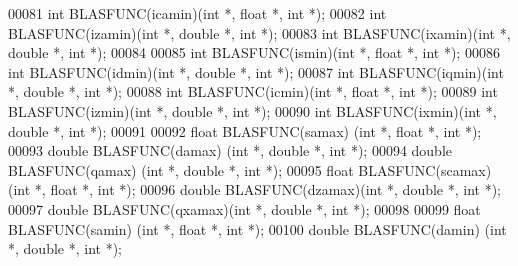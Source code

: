 \begin{DoxyCode}
00081 \textcolor{keywordtype}{int}    BLASFUNC(icamin)(\textcolor{keywordtype}{int} *, \textcolor{keywordtype}{float}  *, \textcolor{keywordtype}{int} *);
00082 \textcolor{keywordtype}{int}    BLASFUNC(izamin)(\textcolor{keywordtype}{int} *, \textcolor{keywordtype}{double} *, \textcolor{keywordtype}{int} *);
00083 \textcolor{keywordtype}{int}    BLASFUNC(ixamin)(\textcolor{keywordtype}{int} *, \textcolor{keywordtype}{double} *, \textcolor{keywordtype}{int} *);
00084 
00085 \textcolor{keywordtype}{int}    BLASFUNC(ismin)(\textcolor{keywordtype}{int} *, \textcolor{keywordtype}{float}  *, \textcolor{keywordtype}{int} *);
00086 \textcolor{keywordtype}{int}    BLASFUNC(idmin)(\textcolor{keywordtype}{int} *, \textcolor{keywordtype}{double} *, \textcolor{keywordtype}{int} *);
00087 \textcolor{keywordtype}{int}    BLASFUNC(iqmin)(\textcolor{keywordtype}{int} *, \textcolor{keywordtype}{double} *, \textcolor{keywordtype}{int} *);
00088 \textcolor{keywordtype}{int}    BLASFUNC(icmin)(\textcolor{keywordtype}{int} *, \textcolor{keywordtype}{float}  *, \textcolor{keywordtype}{int} *);
00089 \textcolor{keywordtype}{int}    BLASFUNC(izmin)(\textcolor{keywordtype}{int} *, \textcolor{keywordtype}{double} *, \textcolor{keywordtype}{int} *);
00090 \textcolor{keywordtype}{int}    BLASFUNC(ixmin)(\textcolor{keywordtype}{int} *, \textcolor{keywordtype}{double} *, \textcolor{keywordtype}{int} *);
00091 
00092 \textcolor{keywordtype}{float}  BLASFUNC(samax) (\textcolor{keywordtype}{int} *, \textcolor{keywordtype}{float}  *, \textcolor{keywordtype}{int} *);
00093 \textcolor{keywordtype}{double} BLASFUNC(damax) (\textcolor{keywordtype}{int} *, \textcolor{keywordtype}{double} *, \textcolor{keywordtype}{int} *);
00094 \textcolor{keywordtype}{double} BLASFUNC(qamax) (\textcolor{keywordtype}{int} *, \textcolor{keywordtype}{double} *, \textcolor{keywordtype}{int} *);
00095 \textcolor{keywordtype}{float}  BLASFUNC(scamax)(\textcolor{keywordtype}{int} *, \textcolor{keywordtype}{float}  *, \textcolor{keywordtype}{int} *);
00096 \textcolor{keywordtype}{double} BLASFUNC(dzamax)(\textcolor{keywordtype}{int} *, \textcolor{keywordtype}{double} *, \textcolor{keywordtype}{int} *);
00097 \textcolor{keywordtype}{double} BLASFUNC(qxamax)(\textcolor{keywordtype}{int} *, \textcolor{keywordtype}{double} *, \textcolor{keywordtype}{int} *);
00098 
00099 \textcolor{keywordtype}{float}  BLASFUNC(samin) (\textcolor{keywordtype}{int} *, \textcolor{keywordtype}{float}  *, \textcolor{keywordtype}{int} *);
00100 \textcolor{keywordtype}{double} BLASFUNC(damin) (\textcolor{keywordtype}{int} *, \textcolor{keywordtype}{double} *, \textcolor{keywordtype}{int} *);

\end{DoxyCode}
